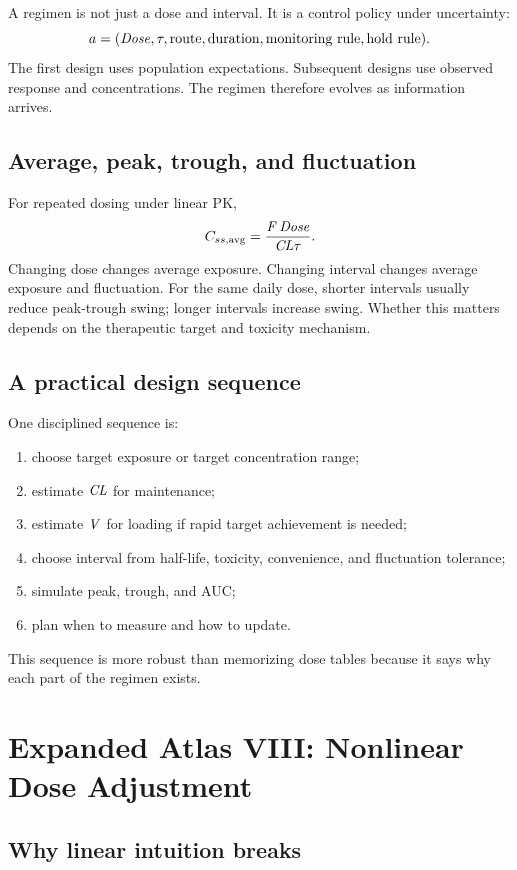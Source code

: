 A regimen is not just a dose and interval. It is a control policy under uncertainty:
\[
  a=(\pksym{Dose},\tau,\text{route},\text{duration},\text{monitoring rule},\text{hold rule}).
\]
The first design uses population expectations. Subsequent designs use observed response and concentrations. The regimen therefore evolves as information arrives.

\subsection{Average, peak, trough, and fluctuation}

For repeated dosing under linear PK,
\[
  \pkCavg=\frac{\pkF\,\pksym{Dose}}{\pkCL\tau}.
\]
Changing dose changes average exposure. Changing interval changes average exposure and fluctuation. For the same daily dose, shorter intervals usually reduce peak-trough swing; longer intervals increase swing. Whether this matters depends on the therapeutic target and toxicity mechanism.

\subsection{A practical design sequence}

One disciplined sequence is:
\begin{enumerate}[leftmargin=2em]
  \item choose target exposure or target concentration range;
  \item estimate \(\pkCL\) for maintenance;
  \item estimate \(\pkV\) for loading if rapid target achievement is needed;
  \item choose interval from half-life, toxicity, convenience, and fluctuation tolerance;
  \item simulate peak, trough, and AUC;
  \item plan when to measure and how to update.
\end{enumerate}
This sequence is more robust than memorizing dose tables because it says why each part of the regimen exists.

\section{Expanded Atlas VIII: Nonlinear Dose Adjustment}

\subsection{Why linear intuition breaks}

